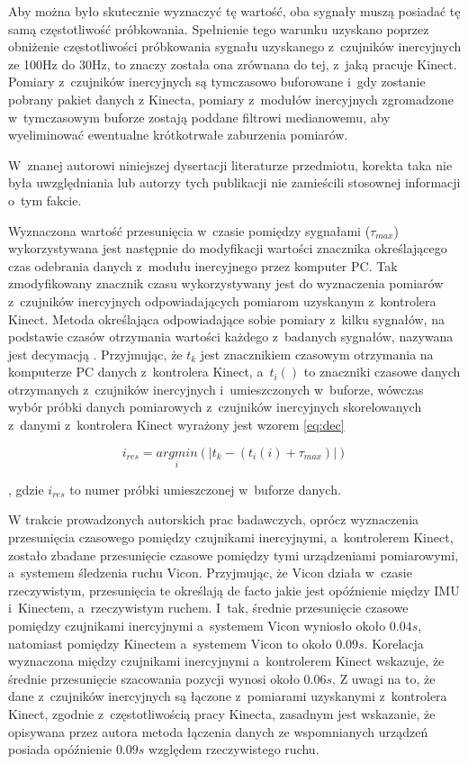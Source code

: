 Aby można było skutecznie wyznaczyć tę wartość, oba sygnały muszą posiadać tę samą częstotliwość próbkowania. Spełnienie tego warunku uzyskano poprzez obniżenie częstotliwości próbkowania sygnału uzyskanego z~czujników inercyjnych ze 100Hz  do 30Hz, to znaczy została ona zrównana do tej, z~jaką pracuje Kinect. Pomiary z~czujników inercyjnych są tymczasowo buforowane i~gdy zostanie pobrany pakiet danych z Kinecta, pomiary z~modułów inercyjnych zgromadzone w~tymczasowym buforze zostają poddane filtrowi medianowemu, aby wyeliminować ewentualne krótkotrwałe zaburzenia pomiarów. 
										
W~znanej autorowi niniejszej dysertacji literaturze przedmiotu, korekta taka nie była uwzględniania lub autorzy tych publikacji nie zamieścili stosownej informacji o~tym fakcie.

Wyznaczona wartość przesunięcia w~czasie pomiędzy sygnałami ($\tau_{max}$) wykorzystywana jest następnie do modyfikacji wartości znacznika określającego czas odebrania danych z~modułu inercyjnego przez komputer PC. Tak zmodyfikowany znacznik czasu wykorzystywany jest do wyznaczenia pomiarów z~czujników inercyjnych odpowiadających pomiarom uzyskanym z~kontrolera Kinect. Metoda określająca odpowiadające sobie pomiary z~kilku sygnałów, na podstawie czasów otrzymania wartości każdego z~badanych sygnałów, nazywana jest decymacją \cite{Hinton2001}. Przyjmując, że $t_k$ jest znacznikiem czasowym otrzymania na komputerze PC danych z~kontrolera Kinect, a~$t_i()$ to znaczniki czasowe danych  otrzymanych z~czujników inercyjnych i~umieszczonych w~buforze, wówczas wybór próbki danych pomiarowych z~czujników inercyjnych skorelowanych z~danymi z~kontrolera Kinect wyrażony jest wzorem \ref{eq:dec}
										
\begin{equation}
	i_{res} = \underset{i}{argmin}(|t_k-(t_i(i) + \tau_{max})|)
	\label{eq:dec}
\end{equation}

, gdzie $i_{res}$ to numer próbki umieszczonej w~buforze danych.
										
W trakcie prowadzonych autorskich prac badawczych, oprócz wyznaczenia przesunięcia czasowego pomiędzy czujnikami inercyjnymi, a~kontrolerem Kinect, zostało zbadane przesunięcie czasowe pomiędzy tymi urządzeniami pomiarowymi, a~systemem śledzenia ruchu Vicon. Przyjmując, że Vicon działa w~czasie rzeczywistym, przesunięcia te określają de facto jakie jest opóźnienie między IMU i~Kinectem, a~rzeczywistym ruchem. I~tak, średnie przesunięcie czasowe pomiędzy czujnikami inercyjnymi a~systemem Vicon wyniosło około $0.04s$, natomiast pomiędzy Kinectem a~systemem Vicon to około $0.09s$. Korelacja wyznaczona między czujnikami inercyjnymi a~kontrolerem Kinect wskazuje, że średnie przesunięcie szacowania pozycji wynosi około $0.06s$. Z uwagi na to, że dane z~czujników inercyjnych są łączone z~pomiarami uzyskanymi z~kontrolera Kinect, zgodnie z~częstotliwością pracy Kinecta, zasadnym jest wskazanie, że opisywana przez autora metoda łączenia danych ze wspomnianych urządzeń posiada opóźnienie $0.09s$ względem rzeczywistego ruchu.
										
